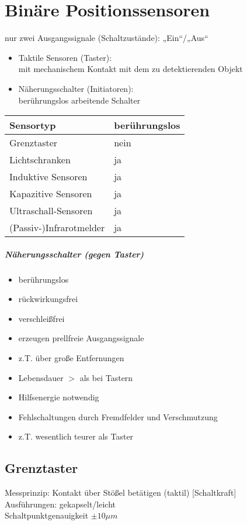 \documentclass{scrreprt}
\begin{document}
\chapter{Binäre Positionssensoren}
nur zwei Ausgangssignale (Schaltzustände): „Ein“/„Aus“
\begin{itemize}
\item Taktile Sensoren (Taster):\\
mit mechanischem Kontakt mit dem zu detektierenden Objekt
\item Näherungsschalter (Initiatoren):\\
berührungslos arbeitende Schalter
\end{itemize}
\begin{tabular}{l | l}
Sensortyp & berührungslos\\\hline
Grenztaster & nein \\
Lichtschranken & ja \\
Induktive Sensoren & ja\\
Kapazitive Sensoren & ja\\
Ultraschall-Sensoren & ja\\
(Passiv-)Infrarotmelder & ja
\end{tabular}

\paragraph{Näherungsschalter (gegen Taster)}
\begin{itemize}[label=$+$]
\item berührungslos
\item rückwirkungsfrei
\item verschleißfrei
\item erzeugen prellfreie Ausgangssignale
\item z.T. über große Entfernungen
\item Lebensdauer $>$ als bei Tastern
\end{itemize}
\begin{itemize}[label=$-$]
\item Hilfsenergie notwendig
\item Fehlschaltungen durch Fremdfelder und Verschmutzung
\item z.T. wesentlich teurer als Taster
\end{itemize}

\section{Grenztaster}
Messprinzip: Kontakt über Stößel betätigen (taktil) [Schaltkraft]\\
Ausführungen: gekapselt/leicht\\
Schaltpunktgenauigkeit $\pm 10 \unit{\mu m}$
\end{document}
